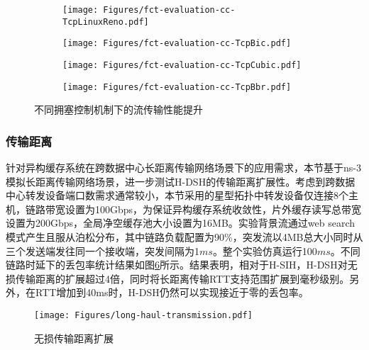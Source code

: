 
\begin{figure}[H]
  \begin{subfigure}[b]{0.49\linewidth}
      \centering
      \texttt{[image: Figures/fct-evaluation-cc-TcpLinuxReno.pdf]}
      \label{c3:s6:ss1:fig:sub1:fct tcp reno}
  \end{subfigure}
  \begin{subfigure}[b]{0.49\linewidth}
      \centering
      \texttt{[image: Figures/fct-evaluation-cc-TcpBic.pdf]}
      \label{c3:s6:ss1:fig:sub1:fct tcp bic}
  \end{subfigure}
  \begin{subfigure}[b]{0.49\linewidth}
    \centering
    \texttt{[image: Figures/fct-evaluation-cc-TcpCubic.pdf]}
    \label{c3:s6:ss1:fig:sub1:fct tcp cubic}
  \end{subfigure}
  \begin{subfigure}[b]{0.49\linewidth}
    \centering
    \texttt{[image: Figures/fct-evaluation-cc-TcpBbr.pdf]}
    \label{c3:s6:ss1:fig:sub1:fct tcp bbr}
  \end{subfigure}  
  \caption{不同拥塞控制机制下的流传输性能提升}
  \label{c3:s6:ss1:fig:fct different cc}
\end{figure}

\subsubsection{传输距离}

针对异构缓存系统在跨数据中心长距离传输网络场景下的应用需求，本节基于ns-3模拟长距离传输网络场景，进一步测试H-DSH的传输距离扩展性。考虑到跨数据中心转发设备端口数需求通常较小，本节采用的星型拓扑中转发设备仅连接8个主机，链路带宽设置为100Gbps，为保证异构缓存系统收敛性，片外缓存读写总带宽设置为200Gbps，全局净空缓存池大小设置为16MB。实验背景流通过web search模式产生且服从泊松分布，其中链路负载配置为90\%，突发流以4MB总大小同时从三个发送端发往同一个接收端，突发间隔为1$ms$。整个实验仿真运行100$ms$。不同链路时延下的丢包率统计结果如图\ref{c4:s1:ss1:lossless distance}所示。结果表明，相对于H-SIH，H-DSH对无损传输距离的扩展超过4倍，同时将长距离传输RTT支持范围扩展到毫秒级别。另外，在RTT增加到40ms时，H-DSH仍然可以实现接近于零的丢包率。

\begin{figure}[H]
  \centering
  \texttt{[image: Figures/long-haul-transmission.pdf]}
  \caption{无损传输距离扩展}
  \label{c4:s1:ss1:lossless distance}
\end{figure}

